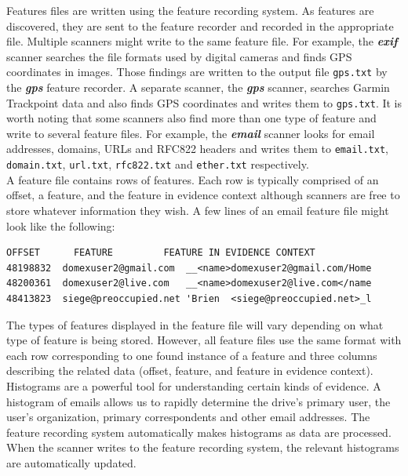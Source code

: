 \documentclass[11pt]{article} %
\begin{document}
Features files are written using the feature recording system. As features are discovered, they are sent to the feature recorder and recorded in the appropriate file. Multiple scanners might write to the same feature file. For example, the  \textbf{\textit{exif}} scanner searches the file formats used by digital cameras and finds GPS coordinates in images. Those findings are written to the output file \texttt{gps.txt} by the \textbf{\textit{gps}} feature recorder. A separate scanner, the  \textbf{\textit{gps}} scanner, searches Garmin Trackpoint data and also finds GPS coordinates and writes them to \texttt{gps.txt}.  It is worth noting that some scanners also find more than one type of feature and write to several feature files. For example, the  \textbf{\textit{email}} scanner looks for email addresses, domains, URLs and RFC822 headers and writes them to \texttt{email.txt}, \texttt{domain.txt}, \texttt{url.txt}, \texttt{rfc822.txt} and \texttt{ether.txt} respectively.\\

A feature file contains rows of features. Each row is typically comprised of an offset, a feature, and the feature in evidence context although scanners are free to store whatever information they wish. A few lines of an email feature file might look like the following:\\ 
\lstset{style=customfile}
\begin{lstlisting}
OFFSET      FEATURE	        FEATURE IN EVIDENCE CONTEXT
48198832  domexuser2@gmail.com 	__<name>domexuser2@gmail.com/Home
48200361  domexuser2@live.com 	__<name>domexuser2@live.com</name
48413823  siege@preoccupied.net	'Brien  <siege@preoccupied.net>_l
\end{lstlisting}

The types of features displayed in the feature file will vary depending on what type of feature is being stored. However, all feature files use the same format with each row corresponding to one found instance of a feature and three columns describing the related data (offset, feature, and feature in evidence context). \\

Histograms are a powerful tool for understanding certain kinds of evidence. A histogram of emails allows us to rapidly determine the drive's primary user, the user's organization, primary correspondents and other email addresses. The feature recording system automatically makes histograms as data are processed. When the scanner writes to the feature recording system, the relevant histograms are automatically updated. \\ 
\end{document}

